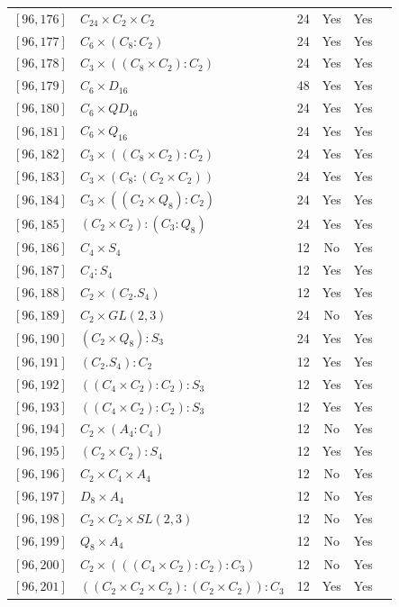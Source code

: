 \documentclass[12pt, a4paper]{article}
\theoremstyle{plain}
\theoremstyle{definition}
\begin{document}
\begin{longtable}{llcccl}
  $[96,176]$ & $C_{24} \times C_2 \times C_2$ & 24 & Yes & Yes \\
  $[96,177]$ & $C_6 \times (C_8 : C_2)$ & 24 & Yes & Yes \\
  $[96,178]$ & $C_3 \times ((C_8 \times C_2) : C_2)$ & 24 & Yes & Yes \\
  $[96,179]$ & $C_6 \times D_{16}$ & 48 & Yes & Yes \\
  $[96,180]$ & $C_6 \times QD_{16}$ & 24 & Yes & Yes \\
  $[96,181]$ & $C_6 \times Q_{16}$ & 24 & Yes & Yes \\
  $[96,182]$ & $C_3 \times ((C_8 \times C_2) : C_2)$ & 24 & Yes & Yes \\
  $[96,183]$ & $C_3 \times (C_8 : (C_2 \times C_2))$ & 24 & Yes & Yes \\
  $[96,184]$ & $C_3 \times ((C_2 \times Q_8) : C_2)$ & 24 & Yes & Yes \\
  $[96,185]$ & $(C_2 \times C_2) : (C_3 : Q_8)$ & 24 & Yes & Yes \\
  $[96,186]$ & $C_4 \times S_4$ & 12 & No & Yes \\
  $[96,187]$ & $C_4 : S_4$ & 12 & Yes & Yes \\
  $[96,188]$ & $C_2 \times (C_2 . S_4)$ & 12 & Yes & Yes \\
  $[96,189]$ & $C_2 \times GL(2,3)$ & 24 & No & Yes \\
  $[96,190]$ & $(C_2 \times Q_8) : S_3$ & 24 & Yes & Yes \\
  $[96,191]$ & $(C_2 . S_4) : C_2$ & 12 & Yes & Yes \\
  $[96,192]$ & $((C_4 \times C_2) : C_2) : S_3$ & 12 & Yes & Yes \\
  $[96,193]$ & $((C_4 \times C_2) : C_2) : S_3$ & 12 & Yes & Yes \\
  $[96,194]$ & $C_2 \times (A_4 : C_4)$ & 12 & No & Yes \\
  $[96,195]$ & $(C_2 \times C_2) : S_4$ & 12 & Yes & Yes \\
  $[96,196]$ & $C_2 \times C_4 \times A_4$ & 12 & No & Yes \\
  $[96,197]$ & $D_8 \times A_4$ & 12 & No & Yes \\
  $[96,198]$ & $C_2 \times C_2 \times SL(2,3)$ & 12 & No & Yes \\
  $[96,199]$ & $Q_8 \times A_4$ & 12 & No & Yes \\
  $[96,200]$ & $C_2 \times (((C_4 \times C_2) : C_2) : C_3)$ & 12 & No & Yes \\
  $[96,201]$ & $((C_2 \times C_2 \times C_2) : (C_2 \times C_2)) : C_3$ & 12 & Yes & Yes \\

\end{longtable}
\end{document}
